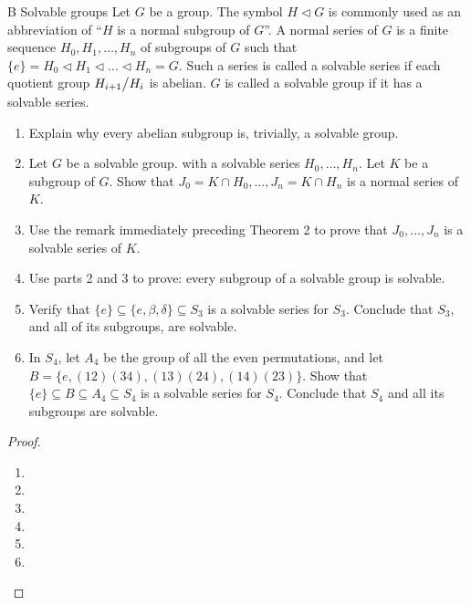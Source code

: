 \begin{exercise}{B Solvable groups}
Let $G$ be a group. The symbol $H\triangleleft G$ is commonly used as an abbreviation of ``$H$ is a normal subgroup of $G$''. A normal series of $G$ is a finite sequence $H_0,H_1,\dots,H_n$ of subgroups of $G$ such that $\{e\}=H_0\triangleleft H_1\triangleleft\dots\triangleleft H_n=G$. Such a series is called a solvable series if each quotient group ${\textstyle H_{i+1}}\big/{\textstyle H_i}$ is abelian. $G$ is called a solvable group if it has a solvable series.
\begin{enumerate}
    \item Explain why every abelian subgroup is, trivially, a solvable group.
    \item Let $G$ be a solvable group. with a solvable series $H_0,\dots,H_n$. Let $K$ be a subgroup of $G$. Show that $J_0=K\cap H_0,\dots,J_n=K\cap H_n$ is a normal series of $K$.
    \item Use the remark immediately preceding Theorem 2 to prove that $J_0,\dots,J_n$ is a solvable series of $K$.
     \item Use parts 2 and 3 to prove: every subgroup of a solvable group is solvable.
     \item Verify that $\{e\}\subseteq\{e,\beta,\delta\}\subseteq S_3$ is a solvable series for $S_3$. Conclude that $S_3$, and all of its subgroups, are solvable.
     \item In $S_4$, let $A_4$ be the group of all the even permutations, and let $B=\{e,(12)(34),(13)(24),(14)(23)\}$. Show that $\{e\}\subseteq B\subseteq A_4\subseteq S_4$ is a solvable series for $S_4$. Conclude that $S_4$ and all its subgroups are solvable.
\end{enumerate}
\end{exercise}
\begin{proof}
 \begin{enumerate}
     \item 
     \item
     \item 
     \item
     \item
     \item
 \end{enumerate}
\end{proof}